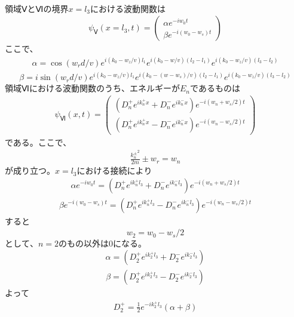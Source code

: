 $領域ⅤとⅥの境界x=l_{3}における波動関数は$
\begin{align}
{\psi}_{Ⅴ}(x=l_{3},t)=
\begin{pmatrix}
{\alpha}e^{-iw_{0}t} \\
{\beta}e^{-i(w_{0}-w_{s})t}
\end{pmatrix}
\end{align}
ここで、
\begin{align}
{\alpha}=\cos\left(w_{r}d/v\right)e^{i(k_{0}-w_{z}/v)l_{1}}e^{i\left(k_{0}-w/v\right)(l_{2}-l_{1})}e^{i\left(k_{0}-w_{z}/v\right)(l_{3}-l_{2})}
\end{align}
\begin{align}
{\beta}=i\sin\left(w_{r}d/v\right)e^{i(k_{0}-w_{z}/v)l_{1}}e^{i\left(k_{0}-(w-w_{s})/v\right)(l_{2}-l_{1})}e^{i\left(k_{0}-w_{z}/v\right)(l_{3}-l_{2})}
\end{align}
$領域Ⅵにおける波動関数のうち、エネルギーがE_{n}であるものは$
\begin{align}
{\psi}_{Ⅵ}(x,t)=
\begin{pmatrix}
(D_{n}^{+}e^{ik_{n}^{+}x}+D_{n}^{-}e^{ik_{n}^{-}x} )e^{-i(w_{n}+w_{s}/2)t}\\
(D_{n}^{+}e^{ik_{n}^{+}x}-D_{n}^{-}e^{ik_{n}^{-}x} )e^{-i(w_{n}-w_{s}/2)t}
\end{pmatrix}
\end{align}
である。ここで、
\begin{align}
\frac{{k_{n}^{\pm}}^2}{2m}{\pm}w_{r}=w_{n}
\end{align}
$が成り立つ。x=l_{3}における接続により$
\begin{align}
{\alpha}e^{-iw_{0}t}=\left(D_{n}^{+}e^{ik_{n}^{+}l_{3}}+D_{n}^{-}e^{ik_{n}^{-}l_{3}}\right)e^{-i\left(w_{n}+w_{s}/2\right)t}
\end{align}
\begin{align}
{\beta}e^{-i(w_{0}-w_{s})t}=\left(D_{n}^{+}e^{ik_{n}^{+}l_{3}}-D_{n}^{-}e^{ik_{n}^{-}l_{3}}\right)e^{-i\left(w_{n}-w_{s}/2\right)t}
\end{align}
すると
\begin{align}
w_{2}=w_{0}-w_{s}/2
\end{align}
$として、n=2のもの以外は0になる。$
\begin{align}
{\alpha}=\left(D_{2}^{+}e^{ik_{2}^{+}l_{3}}+D_{2}^{-}e^{ik_{2}^{-}l_{3}}\right)
\end{align}
\begin{align}
{\beta}=\left(D_{2}^{+}e^{ik_{2}^{+}l_{3}}-D_{2}^{-}e^{ik_{2}^{-}l_{3}}\right)
\end{align}
よって
\begin{align}
D_{2}^{+}=\frac{1}{2}e^{-ik_{2}^{+}l_{3}}({\alpha}+{\beta})
\end{align}
